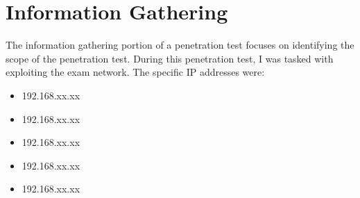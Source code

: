 
\section{\label{sec:information_gathering}Information Gathering}
The information gathering portion of a penetration test focuses on identifying
the scope of the penetration test. During this penetration test, I was tasked
with exploiting the exam network. The specific IP addresses were:

\begin{itemize}
  \item 192.168.xx.xx
  \item 192.168.xx.xx
  \item 192.168.xx.xx
  \item 192.168.xx.xx
  \item 192.168.xx.xx
\end{itemize}
